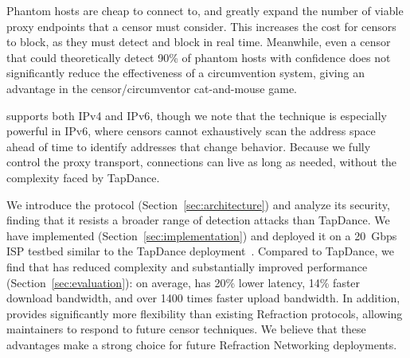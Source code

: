 \documentclass[sigconf]{acmart}
\begin{document}

Phantom hosts are cheap to connect to, and greatly expand the 
number of viable proxy endpoints that a censor must consider. This increases the cost for censors to
block, as they must detect and block in real time. Meanwhile, even a censor that
could theoretically detect 90\% of phantom hosts with confidence does not significantly reduce the
effectiveness of a circumvention system, giving \scheme an advantage in the censor/circumventor
cat-and-mouse game.

\scheme supports both IPv4 and IPv6,
though we note that the technique is especially
powerful in IPv6, where censors cannot exhaustively scan the address space
ahead of time to identify addresses that change behavior.
Because we fully control the proxy transport, connections can live as
long as needed, without the complexity faced by TapDance.




We introduce the \scheme protocol (Section~\ref{sec:architecture})
and analyze its security, finding that it resists a broader
range of detection attacks than TapDance.
We have implemented \scheme (Section~\ref{sec:implementation})
and deployed it on a 20~Gbps ISP testbed similar to the TapDance
deployment~\cite{frolov2017isp}.  Compared to TapDance, we find that
\scheme has reduced complexity and substantially improved performance
(Section~\ref{sec:evaluation}): on average, \scheme has 20\% lower latency,
14\% faster download bandwidth, and over 1400 times faster upload bandwidth.
In addition, \scheme provides significantly
more flexibility than existing Refraction protocols, allowing maintainers to
respond to future censor techniques.
We believe that these advantages
make \scheme a strong choice for future Refraction Networking deployments.
\end{document}
